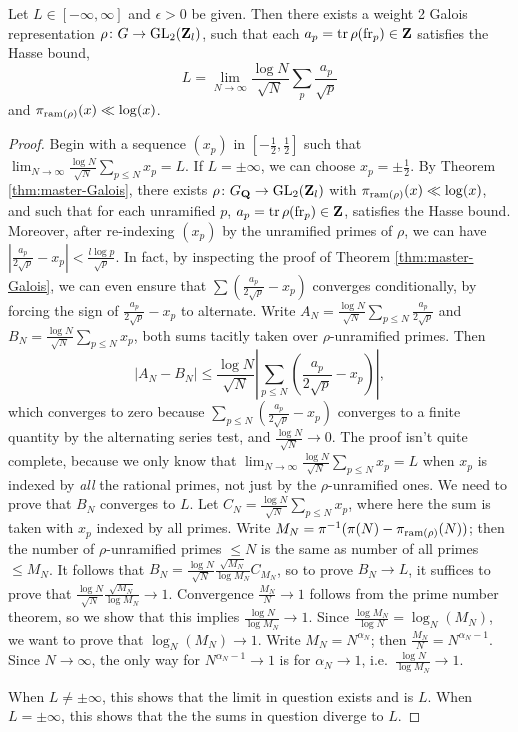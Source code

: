 \begin{corollary}
Let $L \in [-\infty,\infty]$ and $\epsilon>0$ be given. Then there exists a 
weight 2 Galois representation $\rho\colon G\to \operatorname{GL}_2(\mathbf{Z}_l)$, such that 
each $a_p = \operatorname{tr}\rho(\mathrm{fr}_p)\in \mathbf{Z}$ satisfies the Hasse bound, 
\[
	L = \lim_{N\to \infty} \frac{\log N}{\sqrt N}\sum_p \frac{a_p}{\sqrt p} 
\]
and $\pi_{\mathrm{ram}(\rho)}(x) \ll \log(x)$. 
\end{corollary}
\begin{proof}
Begin with a sequence $(x_p)$ in $\left[-\frac 1 2,\frac 1 2\right]$ such that 
$\lim_{N\to \infty} \frac{\log N}{\sqrt N}\sum_{p\leqslant N} x_p = L$. If 
$L=\pm \infty$, we can choose $x_p = \pm \frac 1 2$. By Theorem 
\ref{thm:master-Galois}, there exists $\rho\colon G_{\mathbf{Q}} \to \operatorname{GL}_2(\mathbf{Z}_l)$ with 
$\pi_{\mathrm{ram}(\rho)}(x) \ll \log(x)$, and such that for each unramified $p$, 
$a_p = \operatorname{tr}\rho(\mathrm{fr}_p)\in \mathbf{Z}$, satisfies the Hasse bound. Moreover, after 
re-indexing $(x_p)$ by the unramified primes of $\rho$, we can have 
$\left| \frac{a_p}{2\sqrt p} - x_p\right| < \frac{l \log p}{\sqrt p}$. In fact, 
by inspecting the proof of Theorem \ref{thm:master-Galois}, we can even ensure 
that
$\sum \left(\frac{a_p}{2\sqrt p} - x_p\right)$ converges conditionally, by 
forcing the sign of $\frac{a_p}{2\sqrt p} - x_p$ to alternate.  
Write $A_N = \frac{\log N}{\sqrt N}\sum_{p\leqslant N} \frac{a_p}{2\sqrt p}$ 
and $B_N = \frac{\log N}{\sqrt N} \sum_{p\leqslant N} x_p$, both sums tacitly 
taken over $\rho$-unramified primes. Then 
\[
	\left| A_N - B_N\right| \leqslant \frac{\log N}{\sqrt N} \left| \sum_{p\leqslant N} \left(\frac{a_p}{2\sqrt p} - x_p\right)\right| ,
\]
which converges to zero because 
$\sum_{p\leqslant N} \left(\frac{a_p}{2\sqrt p} - x_p\right)$ converges to a 
finite quantity by the alternating series test, and 
$\frac{\log N}{\sqrt N} \to 0$. The proof isn't quite 
complete, because we only know that 
$\lim_{N\to \infty} \frac{\log N}{\sqrt N}\sum_{p\leqslant N} x_p = L$ when 
$x_p$ is indexed by \emph{all} the rational primes, not just by the 
$\rho$-unramified ones. We need to prove that $B_N$ converges to $L$. 
Let $C_N = \frac{\log N}{\sqrt N} \sum_{p\leqslant N} x_p$, where here the sum 
is taken with $x_p$ indexed by all primes. Write 
$M_N = \pi^{-1}(\pi(N) - \pi_{\mathrm{ram}(\rho)}(N))$; then the number of 
$\rho$-unramified primes $\leqslant N$ is the same as number of all primes 
$\leqslant M_N$. It follows that 
$B_N = \frac{\log N}{\sqrt N} \frac{\sqrt{M_N}}{\log{M_N}}C_{M_N}$, so to prove 
$B_N \to L$, it suffices to prove that 
$\frac{\log N}{\sqrt N} \frac{\sqrt{M_N}}{\log{M_N}} \to 1$. Convergence 
$\frac{M_N}{N} \to 1$ follows from the prime number theorem, so we show that 
this implies $\frac{\log N}{\log M_N} \to 1$. Since 
$\frac{\log M_N}{\log N} = \log_N(M_N)$, we want to prove 
that $\log_N(M_N) \to 1$. Write $M_N = N^{\alpha_N}$; then 
$\frac{M_N}{N} = N^{\alpha_N - 1}$. Since $N\to \infty$, the only way for 
$N^{\alpha_N - 1} \to 1$ is for $\alpha_N \to 1$, 
i.e.~$\frac{\log N}{\log{M_N}} \to 1$. 

When $L\ne \pm\infty$, this shows that the limit in question exists and is $L$. 
When $L=\pm \infty$, this shows that the the sums in question diverge to $L$. 
\end{proof}
